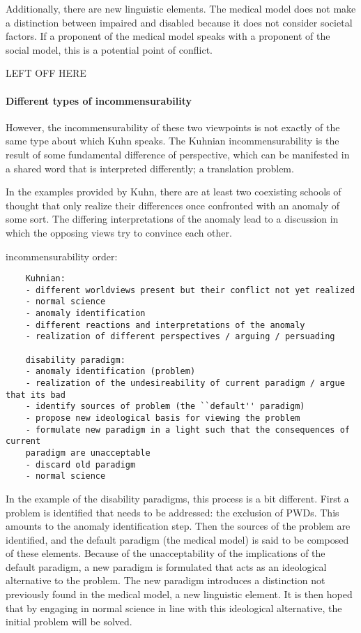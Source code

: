 \documentclass[a4paper]{article}
\begin{document}
Additionally, there are new linguistic elements. The medical model does not
make a distinction between impaired and disabled because it does not consider
societal factors. If a proponent of the medical model speaks with a proponent
of the social model, this is a potential point of conflict.

LEFT OFF HERE


\paragraph{Different types of incommensurability}
However, the incommensurability of these two viewpoints is not exactly of the
same type about which Kuhn speaks. The Kuhnian incommensurability is the
result of some fundamental difference of perspective, which can be manifested
in a shared word that is interpreted differently; a translation problem. 

In the examples provided by Kuhn, there are at least two coexisting schools of
thought that only realize their differences once confronted with an anomaly of
some sort. The differing interpretations of the anomaly lead to a discussion
in which the opposing views try to convince each other.

incommensurability order:

\begin{verbatim}
    Kuhnian: 
    - different worldviews present but their conflict not yet realized
    - normal science
    - anomaly identification
    - different reactions and interpretations of the anomaly
    - realization of different perspectives / arguing / persuading

    disability paradigm: 
    - anomaly identification (problem)
    - realization of the undesireability of current paradigm / argue that its bad
    - identify sources of problem (the ``default'' paradigm)
    - propose new ideological basis for viewing the problem
    - formulate new paradigm in a light such that the consequences of current
    paradigm are unacceptable
    - discard old paradigm
    - normal science
\end{verbatim}


In the example of the disability paradigms, this process is a bit different.
First a problem is identified that needs to be addressed: the exclusion of
PWDs. This amounts to the anomaly identification step. Then the sources of the
problem are identified, and the default paradigm (the medical model) is said
to be composed of these elements. Because of the unacceptability of the
implications of the default paradigm, a new paradigm is formulated that acts
as an ideological alternative to the problem. The new paradigm introduces a
distinction not previously found in the medical model, a new linguistic
element. It is then hoped that by engaging in normal science in line with this
ideological alternative, the initial problem will be solved.
\end{document}

